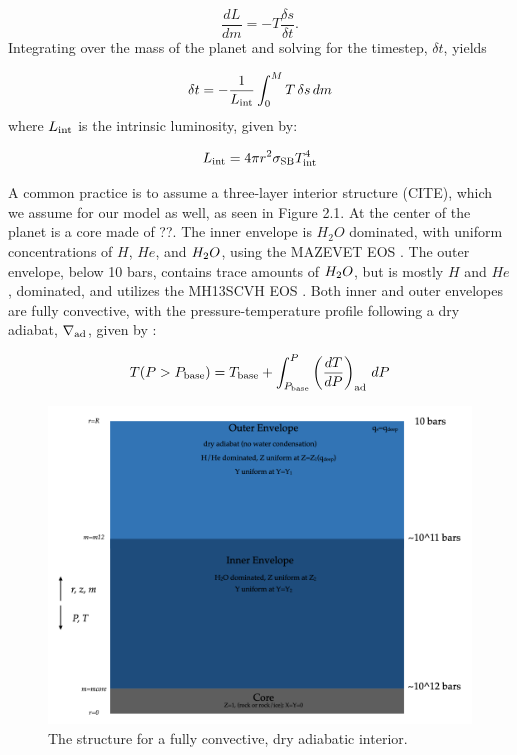 \documentclass[11pt]{ucscthesisbs}
\begin{document}
\begin{equation}
  \frac{dL}{dm}=-T\frac{\delta s}{\delta t}.
\end{equation}
Integrating over the mass of the planet and solving for the timestep, $\delta t$, yields

\begin{equation}
  \delta t=-\frac{1}{L_{\rm int}}\int_0^M T\,\delta s\,dm
\end{equation}
where $L_{\rm int}$ is the intrinsic luminosity, given by:

\begin{equation}
  L_{\rm int} = 4\pi r^{2}\sigma_{\rm SB}T_{\rm int}^{4}
\end{equation}


A common practice is to assume a three-layer interior structure (CITE), which we assume for our model as well, as seen in Figure 2.1. At the center of the planet is a core made of ??. The inner envelope is $H_{2}O$ dominated, with uniform concentrations of $H$, $He$, and $H_{\rm{2}}O$, using the MAZEVET EOS \citep{mazevet_2019}. The outer envelope, below 10 bars, contains trace amounts of $H_{\rm{2}}O$, but is mostly $H$ and $He$, dominated, and utilizes the MH13SCVH EOS \citep{miguel_2018}. Both  inner and outer envelopes are fully convective, with the pressure-temperature profile following a dry adiabat, $\nabla_{\rm ad}$, given by :

\begin{equation}
T(P>P_{\rm base}) = T_{\rm base} + \int_{P_{\rm base}}^P\left(\frac{dT}{dP}\right)_{\rm ad}\,d P
\end{equation}

\begin{figure}[ht!]
 \centerline{
  \includegraphics[width=6.0in]{figures/structure_schematic_images/structure_schematic_images.001.png}
 }
\caption[A Standard Interior Structure Model]
{The structure for a fully convective, dry adiabatic interior.}
\label{fig:standard_dry_interior}
\end{figure}
\end{document}

